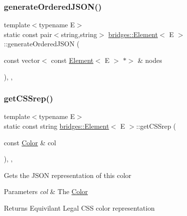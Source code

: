 \subsubsection{\texorpdfstring{generate\+Ordered\+J\+S\+O\+N()}{generateOrderedJSON()}}
{\footnotesize\ttfamily template$<$typename E$>$ \\
static const pair$<$string,string$>$ \hyperlink{classbridges_1_1_element}{bridges\+::\+Element}$<$ E $>$\+::generate\+Ordered\+J\+S\+ON (\begin{DoxyParamCaption}\item[{const vector$<$ const \hyperlink{classbridges_1_1_element}{Element}$<$ E $>$ $\ast$$>$ \&}]{nodes }\end{DoxyParamCaption})\hspace{0.3cm}{\ttfamily [inline]}, {\ttfamily [static]}, {\ttfamily [protected]}}

\hypertarget{classbridges_1_1_element_afdff7e2e492144055bf532a73a28b9b1}{}\label{classbridges_1_1_element_afdff7e2e492144055bf532a73a28b9b1} 
\subsubsection{\texorpdfstring{get\+C\+S\+Srep()}{getCSSrep()}}
{\footnotesize\ttfamily template$<$typename E$>$ \\
static const string \hyperlink{classbridges_1_1_element}{bridges\+::\+Element}$<$ E $>$\+::get\+C\+S\+Srep (\begin{DoxyParamCaption}\item[{const \hyperlink{classbridges_1_1_color}{Color} \&}]{col }\end{DoxyParamCaption})\hspace{0.3cm}{\ttfamily [inline]}, {\ttfamily [static]}, {\ttfamily [protected]}}

Gets the J\+S\+ON representation of this color


\begin{DoxyParams}{Parameters}
{\em col} & The \hyperlink{classbridges_1_1_color}{Color} \\
\hline
\end{DoxyParams}
\begin{DoxyReturn}{Returns}
Equivilant Legal C\+SS color representation 
\end{DoxyReturn}
\hypertarget{classbridges_1_1_element_a89d57f5de9663d23e6e2a7aa82d1d1bc}{}\label{classbridges_1_1_element_a89d57f5de9663d23e6e2a7aa82d1d1bc} 
